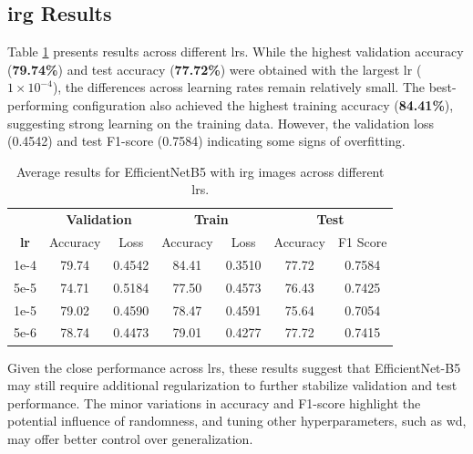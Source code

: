 \subsection{\gls{irg} Results}

Table \ref{tab:efficientnet_b5_irg} presents results across different \glspl{lr}. 
While the highest validation accuracy (\textbf{79.74\%}) and test accuracy (\textbf{77.72\%}) were 
obtained with the largest \gls{lr} ($1\times10^{-4}$), the differences across learning 
rates remain relatively small. The best-performing configuration also achieved the highest training 
accuracy (\textbf{84.41\%}), suggesting strong learning on the training data. However, the 
validation loss (0.4542) and test F1-score (0.7584) indicating some signs of overfitting.

\begin{table}[h]
    \centering
    \renewcommand{\arraystretch}{1.3}
    \setlength{\tabcolsep}{8pt}
    \begin{tabular}{|c|cccccc|}
        \hline
        & \multicolumn{2}{c}{\textbf{Validation}} & \multicolumn{2}{c}{\textbf{Train}} & \multicolumn{2}{c|}{\textbf{Test}} \\
        \textbf{\gls{lr}} & Accuracy & Loss & Accuracy & Loss & Accuracy & F1 Score \\
        \hline
        1e-4  & 79.74  & 0.4542 & 84.41 & 0.3510 & 77.72 & 0.7584 \\
        5e-5  & 74.71  & 0.5184 & 77.50 & 0.4573 & 76.43 & 0.7425 \\
        1e-5  & 79.02  & 0.4590 & 78.47 & 0.4591 & 75.64 & 0.7054 \\
        5e-6  & 78.74  & 0.4473 & 79.01 & 0.4277 & 77.72 & 0.7415 \\
        \hline
    \end{tabular}
    \caption{Average results for EfficientNetB5 with \gls{irg} images across different \glspl{lr}.}
    \label{tab:efficientnet_b5_irg}
\end{table}

Given the close performance across \glspl{lr}, these results suggest that EfficientNet-B5 
may still require additional regularization to further stabilize validation and test performance. 
The minor variations in accuracy and F1-score highlight the potential influence of randomness, and 
tuning other hyperparameters, such as \gls{wd}, may offer better control over generalization.

